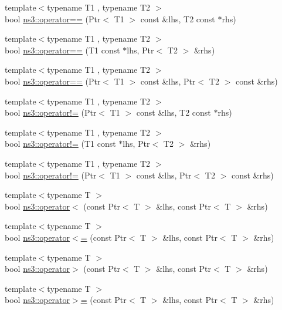 \begin{DoxyCompactItemize}
\item 
{\footnotesize template$<$typename T1 , typename T2 $>$ }\\bool \hyperlink{group__ptr_ga313cf81f0ca3d5397466eee13ff4dcf2}{ns3\+::operator==} (Ptr$<$ T1 $>$ const \&lhs, T2 const $\ast$rhs)
\item 
{\footnotesize template$<$typename T1 , typename T2 $>$ }\\bool \hyperlink{group__ptr_ga858355137690e7513101c1ceb4528ec3}{ns3\+::operator==} (T1 const $\ast$lhs, Ptr$<$ T2 $>$ \&rhs)
\item 
{\footnotesize template$<$typename T1 , typename T2 $>$ }\\bool \hyperlink{group__ptr_gada7fccc5dce5621b3e63cdecba2a9079}{ns3\+::operator==} (Ptr$<$ T1 $>$ const \&lhs, Ptr$<$ T2 $>$ const \&rhs)
\end{DoxyCompactItemize}
\begin{DoxyCompactItemize}
\item 
{\footnotesize template$<$typename T1 , typename T2 $>$ }\\bool \hyperlink{group__ptr_ga8af159a21b0a122225a7310f37cb844c}{ns3\+::operator!=} (Ptr$<$ T1 $>$ const \&lhs, T2 const $\ast$rhs)
\item 
{\footnotesize template$<$typename T1 , typename T2 $>$ }\\bool \hyperlink{group__ptr_ga0f21e525092c317519376b8eaefc5294}{ns3\+::operator!=} (T1 const $\ast$lhs, Ptr$<$ T2 $>$ \&rhs)
\item 
{\footnotesize template$<$typename T1 , typename T2 $>$ }\\bool \hyperlink{group__ptr_ga9135b36114515111f7a313d4c0beb793}{ns3\+::operator!=} (Ptr$<$ T1 $>$ const \&lhs, Ptr$<$ T2 $>$ const \&rhs)
\end{DoxyCompactItemize}
\begin{DoxyCompactItemize}
\item 
{\footnotesize template$<$typename T $>$ }\\bool \hyperlink{group__ptr_ga93be5c3c2ecfdf339686a26ec377200b}{ns3\+::operator$<$} (const Ptr$<$ T $>$ \&lhs, const Ptr$<$ T $>$ \&rhs)
\item 
{\footnotesize template$<$typename T $>$ }\\bool \hyperlink{group__ptr_gad30568dd37f8d9ed358cd654d13a8fc1}{ns3\+::operator$<$=} (const Ptr$<$ T $>$ \&lhs, const Ptr$<$ T $>$ \&rhs)
\item 
{\footnotesize template$<$typename T $>$ }\\bool \hyperlink{group__ptr_gabdee3853c861cda54c9f48998faa5161}{ns3\+::operator$>$} (const Ptr$<$ T $>$ \&lhs, const Ptr$<$ T $>$ \&rhs)
\item 
{\footnotesize template$<$typename T $>$ }\\bool \hyperlink{group__ptr_gab25e899b68bb515e6de77b07703cf942}{ns3\+::operator$>$=} (const Ptr$<$ T $>$ \&lhs, const Ptr$<$ T $>$ \&rhs)
\end{DoxyCompactItemize}


